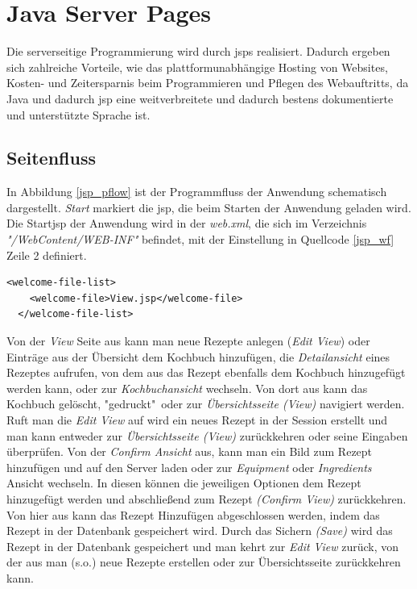 \chapter{Java Server Pages}
Die serverseitige Programmierung wird durch \acrshort{jsp}s realisiert. Dadurch ergeben sich zahlreiche Vorteile, wie das plattformunabhängige Hosting von Websites, Kosten- und Zeitersparnis beim Programmieren und Pflegen des Webauftritts, da Java und dadurch \acrshort{jsp} eine weitverbreitete und dadurch bestens dokumentierte und unterstützte Sprache ist.
\section{Seitenfluss}
In Abbildung \ref{jsp_pflow} ist der Programmfluss der Anwendung schematisch dargestellt. \textit{Start} markiert die \acrshort{jsp}, die beim Starten der Anwendung geladen wird. Die Start\acrshort{jsp} der Anwendung wird in der \textit{web.xml}, die sich im Verzeichnis \textit{"/WebContent/WEB-INF"} befindet, mit der Einstellung in Quellcode \ref{jsp_wf} Zeile 2 definiert.
\begin{lstlisting}[caption={Auswahl der zuerst initialisierten JSP},label=jsp_wf]
  <welcome-file-list>
    <welcome-file>View.jsp</welcome-file>
  </welcome-file-list>
\end{lstlisting}
Von der \textit{View} Seite aus kann man neue Rezepte anlegen (\textit{Edit View}) oder Einträge aus der Übersicht dem Kochbuch hinzufügen, die \textit{Detailansicht} eines Rezeptes aufrufen, von dem aus das Rezept ebenfalls dem Kochbuch hinzugefügt werden kann, oder zur \textit{Kochbuchansicht }wechseln. Von dort aus kann das Kochbuch gelöscht, "gedruckt"\ oder zur \textit{Übersichtsseite (View)} navigiert werden.
Ruft man die \textit{Edit View} auf wird ein neues Rezept in der Session erstellt und man kann entweder zur \textit{Übersichtsseite (View)} zurückkehren oder seine Eingaben überprüfen. Von der \textit{Confirm Ansicht} aus, kann man ein Bild zum Rezept hinzufügen und auf den Server laden oder zur \textit{Equipment} oder \textit{Ingredients} Ansicht wechseln. In diesen können die jeweiligen Optionen dem Rezept hinzugefügt werden und abschließend zum Rezept \textit{(Confirm View)} zurückkehren. Von hier aus kann das Rezept Hinzufügen abgeschlossen werden, indem das Rezept in der Datenbank gespeichert wird. Durch das Sichern \textit{(Save)} wird das Rezept in der Datenbank gespeichert und man kehrt zur \textit{Edit View} zurück, von der aus man (s.o.) neue Rezepte erstellen oder zur Übersichtsseite zurückkehren kann.
